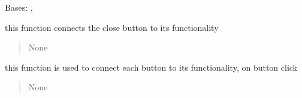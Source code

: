 \documentclass[letterpaper,10pt,english]{sphinxmanual}
\begin{document}
\begin{savenotes}\begin{fulllineitems}
\label{\detokenize{setting/login_UI:oxin.login_UI.UI_main_window}}
\pysigstartsignatures
{}
\pysigstopsignatures
\sphinxAtStartPar
Bases: , 

\begin{savenotes}\begin{fulllineitems}
\label{\detokenize{setting/login_UI:oxin.login_UI.UI_main_window.activate_}}
\pysigstartsignatures
{}
\pysigstopsignatures
\sphinxAtStartPar
this function connects the close button to its functionality
\begin{quote}\begin{description}
\sphinxAtStartPar
None

\end{description}\end{quote}

\end{fulllineitems}\end{savenotes}


\begin{savenotes}\begin{fulllineitems}
\label{\detokenize{setting/login_UI:oxin.login_UI.UI_main_window.buttonClick}}
\pysigstartsignatures
{}
\pysigstopsignatures
\sphinxAtStartPar
this function is used to connect each button to its functionality, on button click
\begin{quote}\begin{description}
\sphinxAtStartPar
None

\end{description}\end{quote}


\end{fulllineitems}
\end{savenotes}
\end{fulllineitems}
\end{savenotes}
\end{document}
